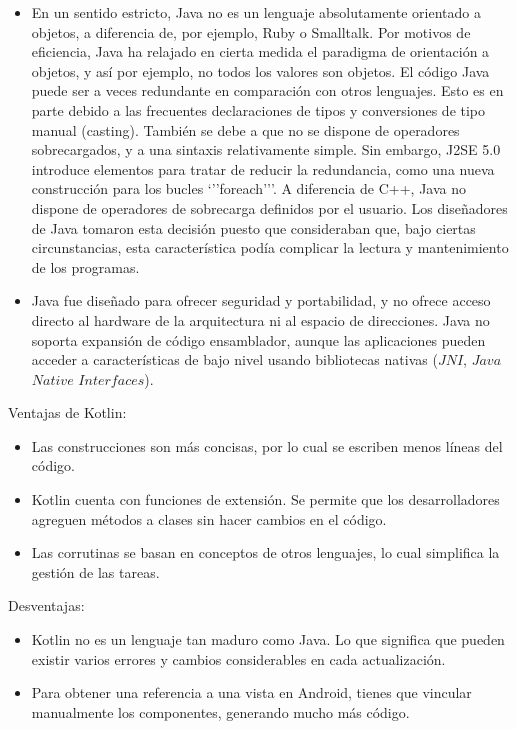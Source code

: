 \begin{itemize}
\item En un sentido estricto, Java no es un lenguaje absolutamente orientado a objetos, a diferencia de, por ejemplo, Ruby o Smalltalk. Por motivos de eficiencia, Java ha relajado en cierta medida el paradigma de orientación a objetos, y así por ejemplo, no todos los valores son objetos.
El código Java puede ser a veces redundante en comparación con otros lenguajes. Esto es en parte debido a las frecuentes declaraciones de tipos y conversiones de tipo manual (casting). También se debe a que no se dispone de operadores sobrecargados, y a una sintaxis relativamente simple. Sin embargo, J2SE 5.0 introduce elementos para tratar de reducir la redundancia, como una nueva construcción para los bucles ‘’’foreach’’’.
A diferencia de C++, Java no dispone de operadores de sobrecarga definidos por el usuario. Los diseñadores de Java tomaron esta decisión puesto que consideraban que, bajo ciertas circunstancias, esta característica podía complicar la lectura y mantenimiento de los programas.

\item Java fue diseñado para ofrecer seguridad y portabilidad, y no ofrece acceso directo al hardware de la arquitectura ni al espacio de direcciones. Java no soporta expansión de código ensamblador, aunque las aplicaciones pueden acceder a características de bajo nivel usando bibliotecas nativas ($JNI$, $Java$ $Native$ $Interfaces$).

\end{itemize}

Ventajas de Kotlin:

\begin{itemize}
\item Las construcciones son más concisas, por lo cual se escriben menos líneas del código.
\item Kotlin cuenta con funciones de extensión. Se permite que los desarrolladores agreguen métodos a clases sin hacer cambios en el código.
\item Las corrutinas se basan en conceptos de otros lenguajes, lo cual simplifica la gestión de las tareas.
\end{itemize}

Desventajas:

\begin{itemize}
\item Kotlin no es un lenguaje tan maduro como Java. Lo que significa que pueden existir varios errores y cambios considerables en cada actualización.
\item Para obtener una referencia a una vista en Android, tienes que vincular manualmente los componentes, generando mucho más código.
\end{itemize}


